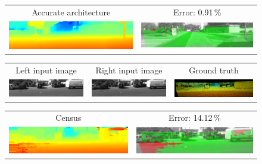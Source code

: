 \documentclass[twoside,11pt]{article}
\begin{document}
\begin{figure}[p]
\begin{center}
\begin{tabular}{cc}
Accurate architecture &
Error: 0.91\,\% \\
\includegraphics[scale=0.5]{img/kitti_slow_50_pred_.png} &
\includegraphics[scale=0.5]{img/kitti_slow_50_err_.png}\\
\end{tabular}

\begin{tabular}{ccc}
\midrule
\rule{0pt}{4ex}Left input image &
Right input image &
Ground truth \\
\includegraphics[scale=0.5]{img/kitti_000069_10L_.png} &
\includegraphics[scale=0.5]{img/kitti_000069_10R_.png} &
\includegraphics[scale=0.5]{img/kitti_69_gt_.png}\\
\end{tabular}

\begin{tabular}{cc}
Census &
Error: 14.12\,\% \\
\includegraphics[scale=0.5]{img/kitti_census_69_pred_.png} &
\includegraphics[scale=0.5]{img/kitti_census_69_err_.png}\\


\end{tabular}
\end{center}
\end{figure}
\end{document}

